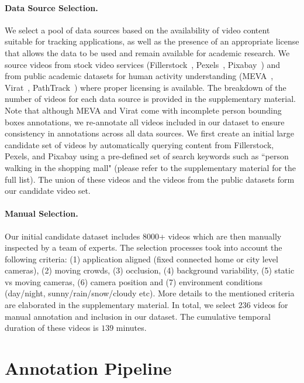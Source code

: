 \documentclass[runningheads]{llncs}
\begin{document}
\paragraph{\textbf{Data Source Selection.}}
We select a pool of data sources based on the availability of video content suitable for tracking applications, as well as the presence of an appropriate license that allows the data to be used and remain available for academic research.
We source videos from stock video services (Fillerstock~\cite{fillerstock}, Pexels~\cite{pexels}, Pixabay~\cite{pixabay}) and from public academic datasets for human activity understanding (MEVA~\cite{meva}, Virat~\cite{virat}, PathTrack~\cite{pathtrack}) where proper licensing is available.  The breakdown of the number of videos for each data source is provided in the supplementary material.
Note that although MEVA and Virat come with incomplete person bounding boxes annotations, we re-annotate all videos included in our dataset to ensure consistency in annotations across all data sources. We first create an initial large candidate set of videos by automatically querying content from Fillerstock, Pexels, and Pixabay using a pre-defined set of search keywords such as ``person walking in the shopping mall" (please refer to the supplementary material for the full list). The union of these videos and the videos from the public datasets form our candidate video set.



\paragraph{\textbf{Manual Selection.}}
Our initial candidate dataset includes 8000+ videos which are then manually inspected by a team of experts. The selection processes took into account the following criteria: (1) application aligned (fixed connected home or city level cameras), (2) moving crowds, (3) occlusion, (4) background variability, (5) static vs moving cameras, (6) camera position and (7) environment conditions (day/night, sunny/rain/snow/cloudy etc). More details to the mentioned criteria are elaborated in the supplementary material.
In total, we select 236 videos for manual annotation and inclusion in our dataset. The cumulative temporal duration of these videos is $139$ minutes.




 \section{Annotation Pipeline}\label{sec:annotation}
\end{document}
